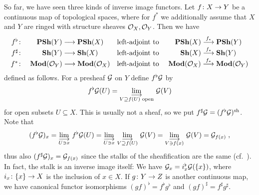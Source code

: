 \documentclass[a4paper,parskip=half,numbers=enddot, DIV=12]{scrreprt}
\begin{document}
\begin{rem}
	\begin{alphanumerate}
		\item{} So far, we have seen three kinds of inverse image functors. Let $f\colon X\morphism Y$ be a continuous map of topological spaces, where for $f^*$ we additionally assume that $X$ and $Y$ are ringed with structure sheaves $\mathcal{O}_X,\mathcal{O}_Y$. Then we have
		\begin{align*}
		\begin{array}{r c l c}
		f^\flat\colon & \cat{PSh}(Y)\morphism[ ]\cat{PSh}(X)&\text{left-adjoint to } & \cat{PSh}(X)\morphism[f_*]\cat{PSh}(Y)\\
		f^\sharp\colon & \cat{Sh}(Y)\morphism[ ]\cat{Sh}(X) & \text{left-adjoint to } & \cat{Sh}(X)\morphism[f_*]\cat{Sh}(Y)\\
		f^*\colon & \cat{Mod}(\Oo_Y)\morphism[ ]\cat{Mod}(\Oo_X) & \text{left-adjoint to } & \cat{Mod}(\Oo_X)\morphism[f_*]\cat{Mod}(\Oo_Y)
		\end{array}
		\end{align*}
		defined as follows. For a presheaf $\mathcal{G}$ on $Y$ define $f^\flat \mathcal{G}$ by 
		\begin{align*}
		f^\flat\Gg(U)=\colimit[V\supseteq f(U)\text{ open}]\Gg(V)
		\end{align*}
		for open subsets $U\subseteq X$. This is usually not a sheaf, so we put $f^\sharp\mathcal{G}=(f^\flat\mathcal{G})^{\mathrm{sh}}$. Note that
		\begin{align*}
		(f^\flat\Gg)_x=\colimit[U\ni x]f^\flat\Gg(U)=\colimit[U\ni x]\colimit[V\supseteq f(U)]\Gg(V)=\colimit[V\ni f(x)]\Gg(V)=\Gg_{f(x)}\;,
		\end{align*}
		thus also $(f^\sharp\mathcal{G})_x=\mathcal{G}_{f(x)}$ since the stalks of the sheafification are the same (cf.\ \cite[Proposition~1.2.1]{alggeo1}). In fact, the stalk is an inverse image itself: We have $\mathcal{G}_x=i_x^\flat\mathcal{G}(\{x\})$, where $i_x\colon\{x\}\morphism X$ is the inclusion of $x\in X$. If $g\colon Y\morphism Z$ is another continuous map, we have canonical functor isomorphisms $(gf)^\flat=f^\flat g^\flat$ and $(gf)^\sharp =f^\sharp g^\sharp$.
		

\end{alphanumerate}
\end{rem}
\end{document}
